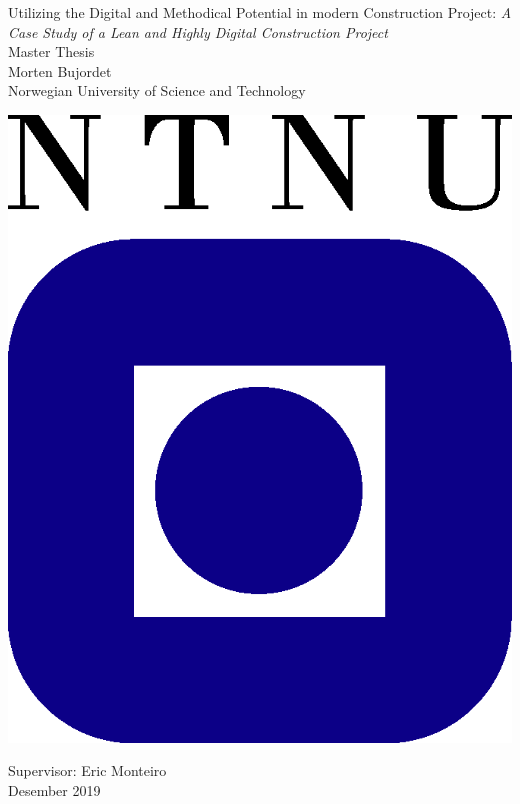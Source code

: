 \clearpage
\begin{titlepage}
    \begin{center}
    
        {\Huge Utilizing the Digital and Methodical Potential in modern Construction Project:} {\Huge\textit{A Case Study of a Lean and Highly Digital Construction Project}} \\[0.4cm]
    
        {\Large Master Thesis} \\[2.0cm]
        {\Large Morten Bujordet} \\ [0.5cm]
        {\Large Norwegian University of Science and Technology}\\
    
        \vspace{3.0cm}
    
                \includegraphics{fig/ntnu-logo2.png}
    
        \vspace{3.0cm}
    
        {\Large Supervisor: Eric Monteiro} \\ [0.2cm]
        {\Large Desember 2019} \\[0.2cm]
    \end{center}
\end{titlepage}
\cleardoublepage